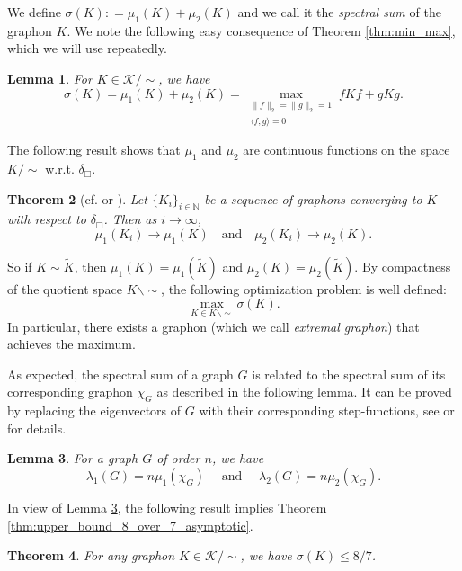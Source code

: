 \documentclass[11pt]{article}
\theoremstyle{plain}
\newtheorem{theorem}{Theorem}[section]
\newtheorem{lemma}[theorem]{Lemma}
\theoremstyle{definition}
\numberwithin{equation}{section}
\begin{document}
We define $\sigma(K): = \mu_1(K) + \mu_2(K)$ and we call it the \emph{spectral sum} 
of the graphon $K$. We note the following easy consequence of Theorem \ref{thm:min_max}, 
which we will use repeatedly.

\begin{lemma}\label{lemma:spectral_sum_graphon} 
For $K\in \mathcal{K}/\sim$, we have
\[
\sigma(K) = \mu_1(K) + \mu_2(K) = \max_{\substack{\| f\|_2=\| g\|_2 = 1\\ \langle f,g\rangle = 0}} fKf + gKg.
\]
\end{lemma}

The following result shows that $\mu_1$ and $\mu_2$ are continuous functions on 
the space $K/ \sim$ w.r.t. $\delta_\Box$. 

\begin{theorem}[cf. {\cite[Theorem 6.6]{Borgs_Chayes_Lovasz_Sos_Vesztergombi_2012}} or {\cite[Theorem 11.54]{Ore_1962}}]
Let $\{K_i\}_{i\in \mathbb{N}}$ be a sequence of graphons converging to $K$ with 
respect to $\delta_\Box$. Then as $i\rightarrow \infty$,  
\[
\mu_1(K_i) \rightarrow \mu_1(K)  \quad \text{and} \quad \mu_2(K_i) \rightarrow \mu_2(K).
\]
\end{theorem}

So if $K \sim \widetilde K$, then $\mu_1(K) = \mu_1(\widetilde{K})$ and $\mu_2(K) = \mu_2(\widetilde{K})$. 
By compactness of the quotient space $K \backslash \sim$, the following optimization problem is well defined: 
\[
\max_{K \in K \backslash \sim} \sigma(K).
\]
In particular, there exists a graphon (which we call \emph{extremal graphon}) that achieves the maximum. 

As expected, the spectral sum of a graph $G$ is related to the spectral sum of its 
corresponding graphon $\chi_G$ as described in the following lemma. It can be proved 
by replacing the eigenvectors of $G$ with their corresponding step-functions, 
see \cite{Liu_2024} or \cite{Terpai_2011} for details.

\begin{lemma}\label{lemma:graph_to_graphon} For a graph $G$ of order $n$, we have 
\[
\lambda_1(G) = n\mu_1(\chi_G)\quad \text{ and }\quad\lambda_2(G) = n\mu_2(\chi_G).
\]
\end{lemma}

In view of Lemma \ref{lemma:graph_to_graphon}, the following result implies 
Theorem \ref{thm:upper_bound_8_over_7_asymptotic}. 

\begin{theorem}\label{thm:upper_bound_8_over_7_graphon}
For any graphon $K\in \mathcal{K}/\sim$, we have $\sigma(K)\leq 8/7$. 
\end{theorem}
\end{document}
